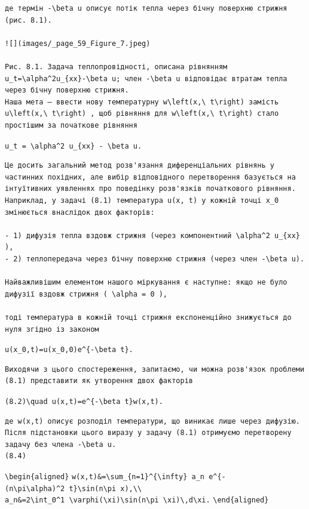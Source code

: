 \documentclass[
  ukrainian,
]{article}
\begin{document}
\begin{verbatim}
де термін -\beta u описує потік тепла через бічну поверхню стрижня (рис. 8.1).

![](images/_page_59_Figure_7.jpeg)

Рис. 8.1. Задача теплопровідності, описана рівнянням u_t=\alpha^2u_{xx}-\beta u; член -\beta u відповідає втратам тепла через бічну поверхню стрижня.
Наша мета — ввести нову температурну w\left(x,\ t\right) замість u\left(x,\ t\right) , щоб рівняння для w\left(x,\ t\right) стало простішим за початкове рівняння
\end{verbatim}

\texttt{u\_t\ =\ \textbackslash{}alpha\^{}2\ u\_\{xx\}\ -\ \textbackslash{}beta\ u.}

\begin{verbatim}
Це досить загальний метод розв'язання диференціальних рівнянь у частинних похідних, але вибір відповідного перетворення базується на інтуїтивних уявленнях про поведінку розв'язків початкового рівняння. Наприклад, у задачі (8.1) температура u(x, t) у кожній точці x_0 змінюється внаслідок двох факторів:

- 1) дифузія тепла вздовж стрижня (через компонентний \alpha^2 u_{xx} ),
- 2) теплопередача через бічну поверхню стрижня (через член -\beta u).

Найважливішим елементом нашого міркування є наступне: якщо не було дифузії вздовж стрижня ( \alpha = 0 ),

тоді температура в кожній точці стрижня експоненційно знижується до нуля згідно із законом
\end{verbatim}

\texttt{u(x\_0,t)=u(x\_0,0)e\^{}\{-\textbackslash{}beta\ t\}.}

\begin{verbatim}
Виходячи з цього спостереження, запитаємо, чи можна розв'язок проблеми (8.1) представити як утворення двох факторів
\end{verbatim}

\texttt{(8.2)\textbackslash{}quad\ u(x,t)=e\^{}\{-\textbackslash{}beta\ t\}w(x,t).}

\begin{verbatim}
де w(x,t) описує розподіл температури, що виникає лише через дифузію. Після підстановки цього виразу у задачу (8.1) отримуємо перетворену задачу без члена -\beta u.
(8.4)
\end{verbatim}

\texttt{\textbackslash{}begin\{aligned\}}
\texttt{w(x,t)\&=\textbackslash{}sum\_\{n=1\}\^{}\{\textbackslash{}infty\}\ a\_n\ e\^{}\{-(n\textbackslash{}pi\textbackslash{}alpha)\^{}2\ t\}\textbackslash{}sin(n\textbackslash{}pi\ x),\textbackslash{}\textbackslash{}}
\texttt{a\_n\&=2\textbackslash{}int\_0\^{}1\ \textbackslash{}varphi(\textbackslash{}xi)\textbackslash{}sin(n\textbackslash{}pi\ \textbackslash{}xi)\textbackslash{},d\textbackslash{}xi.}
\texttt{\textbackslash{}end\{aligned\}}
\end{document}
